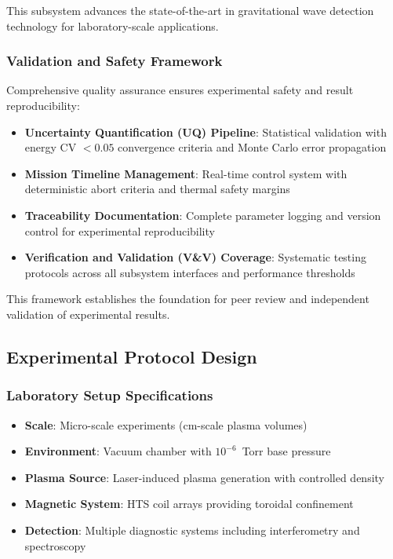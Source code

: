 \documentclass[12pt,a4paper]{article}
\begin{document}
This subsystem advances the state-of-the-art in gravitational wave detection technology for laboratory-scale applications.

\subsubsection{Validation and Safety Framework}

Comprehensive quality assurance ensures experimental safety and result reproducibility:

\begin{itemize}
\item \textbf{Uncertainty Quantification (UQ) Pipeline}: Statistical validation with energy CV $< 0.05$ convergence criteria and Monte Carlo error propagation
\item \textbf{Mission Timeline Management}: Real-time control system with deterministic abort criteria and thermal safety margins
\item \textbf{Traceability Documentation}: Complete parameter logging and version control for experimental reproducibility
\item \textbf{Verification and Validation (V\&V) Coverage}: Systematic testing protocols across all subsystem interfaces and performance thresholds
\end{itemize}

This framework establishes the foundation for peer review and independent validation of experimental results.

\subsection{Experimental Protocol Design}

\subsubsection{Laboratory Setup Specifications}
\begin{itemize}
\item \textbf{Scale}: Micro-scale experiments (cm-scale plasma volumes)
\item \textbf{Environment}: Vacuum chamber with $10^{-6}$~Torr base pressure
\item \textbf{Plasma Source}: Laser-induced plasma generation with controlled density
\item \textbf{Magnetic System}: HTS coil arrays providing toroidal confinement
\item \textbf{Detection}: Multiple diagnostic systems including interferometry and spectroscopy
\end{itemize}
\end{document}
